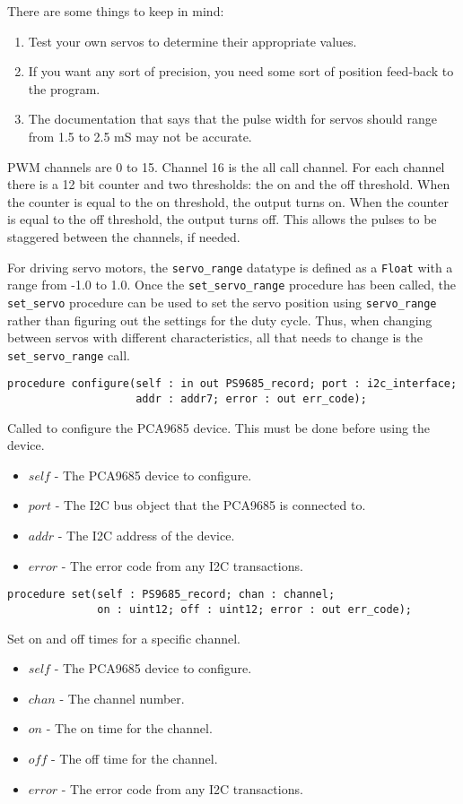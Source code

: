\documentclass[10pt, openany]{book}
\newcommand{\indextype}[1]{\index[type]{#1}}
\newcommand{\indexfunc}[1]{\index[func]{#1}}
\newcommand{\function}[1]{\texttt{#1}}
\newcommand{\datatype}[1]{\texttt{#1}}
\begin{document}
There are some things to keep in mind:
\begin{enumerate}
  \item Test your own servos to determine their appropriate values.
  \item If you want any sort of precision, you need some sort of position feed-back to the program.
  \item The documentation that says that the pulse width for servos should range from 1.5 to 2.5 mS may not be accurate.
\end{enumerate}

PWM channels are 0 to 15.  Channel 16 is the all call channel.  For each channel there is a 12 bit counter and two thresholds: the on and the off threshold.  When the counter is equal to the on threshold, the output turns on.  When the counter is equal to the off threshold, the output turns off.  This allows the pulses to be staggered between the channels, if needed.

For driving servo motors, the \datatype{servo\_range} datatype is defined as a \datatype{Float} with a range from -1.0 to 1.0.  Once the \function{set\_servo\_range} procedure has been called, the \function{set\_servo} procedure can be used to set the servo position using \datatype{servo\_range} rather than figuring out the settings for the duty cycle.  Thus, when changing between servos with different characteristics, all that needs to change is the \function{set\_servo\_range} call.
\indextype{servo\_range}

\begin{lstlisting}
procedure configure(self : in out PS9685_record; port : i2c_interface;
                    addr : addr7; error : out err_code);
\end{lstlisting}
\indexfunc{configure}
Called to configure the PCA9685 device.  This must be done before using the device.
\begin{itemize}
  \item $self$ - The PCA9685 device to configure.
  \item $port$ - The I2C bus object that the PCA9685 is connected to.
  \item $addr$ - The I2C address of the device.
  \item $error$ - The error code from any I2C transactions.
\end{itemize}

\begin{lstlisting}
procedure set(self : PS9685_record; chan : channel;
              on : uint12; off : uint12; error : out err_code);
\end{lstlisting}
\indexfunc{set}
Set on and off times for a specific channel.
\begin{itemize}
  \item $self$ - The PCA9685 device to configure.
  \item $chan$ - The channel number.
  \item $on$ - The on time for the channel.
  \item $off$ - The off time for the channel.
  \item $error$ - The error code from any I2C transactions.
\end{itemize}
\end{document}
